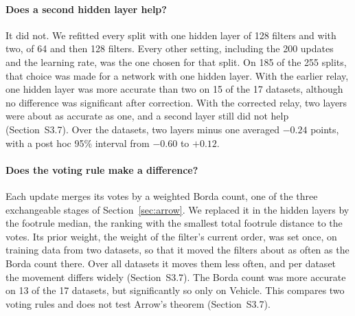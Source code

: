 \paragraph{Does a second hidden layer help?} It did not. We refitted every split with one hidden layer of 128 filters and with two, of 64 and then 128 filters. Every other setting, including the 200 updates and the learning rate, was the one chosen for that split. On 185 of the 255 splits, that choice was made for a network with one hidden layer. With the earlier relay, one hidden layer was more accurate than two on 15 of the 17 datasets, although no difference was significant after correction. With the corrected relay, two layers were about as accurate as one, and a second layer still did not help (Section~S3.7). Over the datasets, two layers minus one averaged $-0.24$ points, with a post hoc 95\% interval from $-0.60$ to $+0.12$.

\paragraph{Does the voting rule make a difference?} Each update merges its votes by a weighted Borda count, one of the three exchangeable stages of Section~\ref{sec:arrow}. We replaced it in the hidden layers by the footrule median, the ranking with the smallest total footrule distance to the votes. Its prior weight, the weight of the filter's current order, was set once, on training data from two datasets, so that it moved the filters about as often as the Borda count there. Over all datasets it moves them less often, and per dataset the movement differs widely (Section~S3.7). The Borda count was more accurate on 13 of the 17 datasets, but significantly so only on Vehicle. This compares two voting rules and does not test Arrow's theorem (Section~S3.7).

